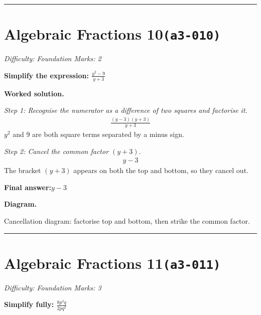 \documentclass[11pt]{article}
\newcommand{\question}[1]{\par\medskip\noindent\textbf{#1}\par}
\begin{document}
\medskip\hrule

\section*{Algebraic Fractions 10\quad\small\texttt{(a3-010)}}
\textit{Difficulty: Foundation \quad\textbar\quad Marks: 2}

\question{Simplify the expression: \( \frac{y^2 - 9}{y + 3} \)}

\textbf{Worked solution.}

\textit{Step 1: Recognise the numerator as a difference of two squares and factorise it.}
\[\begin{gathered}
\frac{(y - 3)(y + 3)}{y + 3}
\end{gathered}\]
\( y^2 \) and 9 are both square terms separated by a minus sign.

\textit{Step 2: Cancel the common factor \( (y + 3) \).}
\[\begin{gathered}
y - 3
\end{gathered}\]
The bracket \( (y + 3) \) appears on both the top and bottom, so they cancel out.

\begin{answerbox}
\textbf{Final answer:}\quad \(\displaystyle y - 3\)
\end{answerbox}
\textbf{Diagram.}

\begin{center}
\end{center}
\small Cancellation diagram: factorise top and bottom, then strike the common factor.\normalsize

\medskip\hrule

\section*{Algebraic Fractions 11\quad\small\texttt{(a3-011)}}
\textit{Difficulty: Foundation \quad\textbar\quad Marks: 3}

\question{Simplify fully: \( \frac{8p^3q}{2pq^2} \)}
\end{document}
